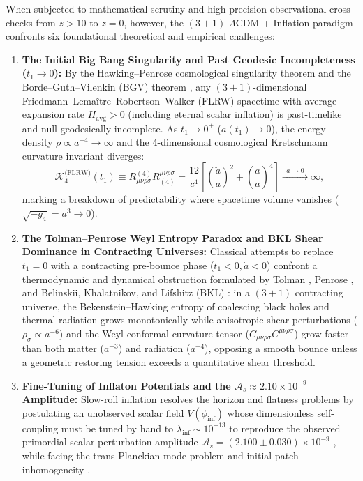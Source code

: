 \documentclass[11pt,a4paper]{article}
\theoremstyle{plain}
\theoremstyle{definition}
\theoremstyle{remark}
\numberwithin{equation}{section}
\begin{document}
When subjected to mathematical scrutiny and high-precision observational cross-checks from $z > 10$ to $z = 0$, however, the $(3+1)$ $\Lambda\text{CDM}$ + Inflation paradigm confronts six foundational theoretical and empirical challenges:
\begin{enumerate}
    \item \textbf{The Initial Big Bang Singularity and Past Geodesic Incompleteness ($t_1 \to 0$):} By the Hawking--Penrose cosmological singularity theorem \cite{hawking1970} and the Borde--Guth--Vilenkin (BGV) theorem \cite{borde2003}, any $(3+1)$-dimensional Friedmann--Lema\^itre--Robertson--Walker (FLRW) spacetime with average expansion rate $H_{\text{avg}} > 0$ (including eternal scalar inflation) is past-timelike and null geodesically incomplete. As $t_1 \to 0^+$ ($a(t_1) \to 0$), the energy density $\rho \propto a^{-4} \to \infty$ and the 4-dimensional cosmological Kretschmann curvature invariant diverges:
    \begin{equation}
    \mathcal{K}_4^{\text{(FLRW)}}(t_1) \equiv R_{\mu\nu\rho\sigma}^{(4)} R^{\mu\nu\rho\sigma}_{(4)} = \frac{12}{c^4} \left[ \left(\frac{\ddot{a}}{a}\right)^2 + \left(\frac{\dot{a}}{a}\right)^4 \right] \xrightarrow{\;\; a \to 0 \;\;} \infty,
    \label{eq:flrw_kretschmann_divergence}
    \end{equation}
    marking a breakdown of predictability where spacetime volume vanishes ($\sqrt{-g_4} = a^3 \to 0$).

    \item \textbf{The Tolman--Penrose Weyl Entropy Paradox and BKL Shear Dominance in Contracting Universes:} Classical attempts to replace $t_1 = 0$ with a contracting pre-bounce phase ($t_1 < 0, \dot{a} < 0$) \cite{tolman1934,steinhardt2002,penrose2010} confront a thermodynamic and dynamical obstruction formulated by Tolman \cite{tolman1934}, Penrose \cite{penrose1979_weyl}, and Belinskii, Khalatnikov, and Lifshitz (BKL) \cite{bkl1970}: in a $(3+1)$ contracting universe, the Bekenstein--Hawking entropy of coalescing black holes and thermal radiation grows monotonically while anisotropic shear perturbations ($\rho_{\sigma} \propto a^{-6}$) and the Weyl conformal curvature tensor ($C_{\mu\nu\rho\sigma} C^{\mu\nu\rho\sigma}$) grow faster than both matter ($a^{-3}$) and radiation ($a^{-4}$), opposing a smooth bounce unless a geometric restoring tension exceeds a quantitative shear threshold.

    \item \textbf{Fine-Tuning of Inflaton Potentials and the $\mathcal{A}_s \approx 2.10 \times 10^{-9}$ Amplitude:} Slow-roll inflation \cite{guth1981,linde1982,mukhanov1981} resolves the horizon and flatness problems by postulating an unobserved scalar field $V(\phi_{\text{inf}})$ whose dimensionless self-coupling must be tuned by hand to $\lambda_{\text{inf}} \sim 10^{-13}$ to reproduce the observed primordial scalar perturbation amplitude $\mathcal{A}_s = (2.100 \pm 0.030) \times 10^{-9}$ \cite{planck2018_vi}, while facing the trans-Planckian mode problem \cite{martin2001} and initial patch inhomogeneity \cite{ijjas2013}.


\end{enumerate}
\end{document}
